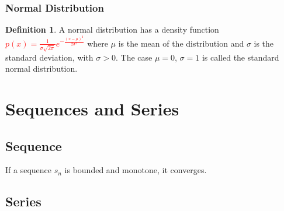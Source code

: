 \documentclass[12pt]{article}
\theoremstyle{definition}
\theoremstyle{definition}
\newtheorem{definition}{Definition}[section]
\theoremstyle{remark}
\theoremstyle{definition}
\theoremstyle{definition}
\theoremstyle{definition}
\begin{document}
\subsubsection*{Normal Distribution}
\begin{definition}
A normal distribution has a density function  
\textcolor{red}{$p(x)=\frac{1}{\sigma \sqrt{2 \pi}}e^{-\frac{(x-\mu)^2}{2\sigma^2}}$} where $\mu$ is the mean of the distribution and $\sigma$ is the standard deviation, with $\sigma > 0$.
The case $\mu = 0$, $\sigma = 1$ is called the standard normal distribution.

\end{definition}

\section{Sequences and Series}
\subsection{Sequence}

If a sequence $s_n$ is bounded and monotone, it converges.


\subsection{Series}
\end{document}
